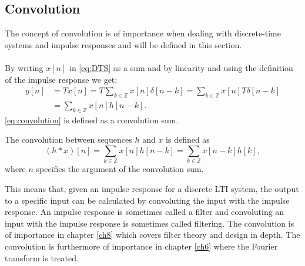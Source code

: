 \subsection{Convolution}\label{sec:convol}
The concept of convolution is of importance when dealing with discrete-time systems and impulse responses and will be defined in this section.\\\\
By writing $x[n]$ in \eqref{eq:DTS} as a sum and by linearity and using the definition of the impulse response we get:
\begin{align}
y[n]&=Tx[n]=T\sum_{k\in\mathbb{Z}}x[n]\delta[n-k]
=\sum_{k\in\mathbb{Z}}x[n]T\delta[n-k]\nonumber\\
&=\sum_{k\in\mathbb{Z}}x[n]h[n-k].\label{eq:convolution}
\end{align}
\eqref{eq:convolution} is defined as a convolution sum.
\begin{definition}\label{def:convolution}
The convolution between sequences $h$ and $x$ is defined as
\begin{equation}
(h*x)[n]=\sum_{k\in\mathbb{Z}}x[n]h[n-k]=\sum_{k\in\mathbb{Z}}x[n-k]h[k],
\end{equation}
where $n$ specifies the argument of the convolution sum.
\end{definition}
This means that, given an impulse response for a discrete LTI system, the output to a specific input can be calculated by convoluting the input with the impulse response. An impulse response is sometimes called a filter and convoluting an input with the impulse response is sometimes called filtering. The convolution is of importance in chapter \ref{ch8} which covers filter theory and design in depth. The convolution is furthermore of importance in chapter \ref{ch6} where the Fourier transform is treated. 











